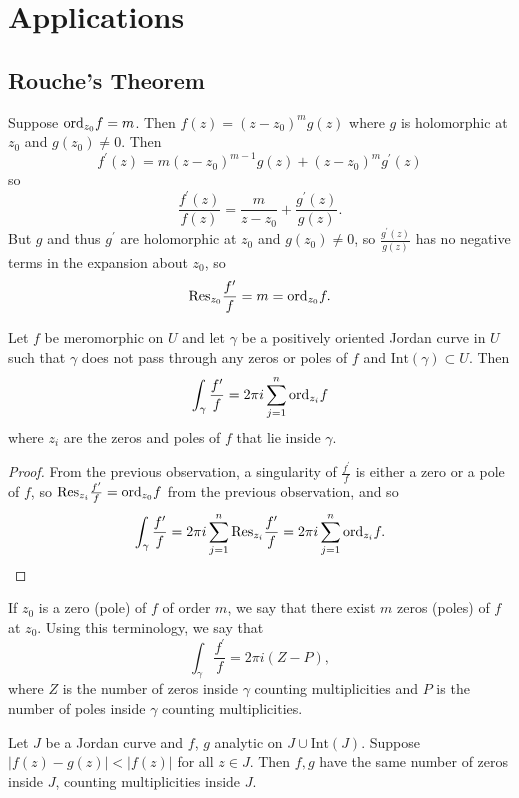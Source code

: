\section{Applications}

\subsection{Rouche's Theorem}

Suppose $\mathrm{ord}_{z_0} f = m$. Then $f(z) = (z - z_0)^m g(z)$
where $g$ is holomorphic at $z_0$ and $g(z_0) \neq 0$. Then
$$
  f^\prime(z)
= m (z - z_0)^{m-1} g(z)
+ (z - z_0)^m g^\prime(z)
$$
so
$$
  \frac{f^\prime(z)}{f(z)}
= \frac{m}{z - z_0}
+ \frac{g^\prime(z)}{g(z)}.
$$
But $g$ and thus $g^\prime$ are holomorphic at $z_0$ and
$g(z_0) \neq 0$, so $\frac{g^\prime(z)}{g(z)}$ has no
negative terms in the expansion about $z_0$, so
$$
  \mathrm{Res}_{z_0} \frac{f^\prime}{f}
= m
= \mathrm{ord}_{z_0} f.
$$

\begin{theorem}
Let $f$ be meromorphic on $U$ and let $\gamma$ be
a positively oriented Jordan curve in $U$ such that
$\gamma$ does not pass through any zeros or poles of $f$
and $\mathrm{Int}(\gamma) \subset U$. Then
$$
  \int_\gamma
    \frac{f^\prime}{f}
= 2 \pi i
  \sum_{j=1}^n
    \mathrm{ord}_{z_i} f
$$
where $z_i$ are the zeros and poles of $f$ that lie inside $\gamma$.
\end{theorem}
\begin{proof}
From the previous observation, a singularity of
$\frac{f^\prime}{f}$ is either a zero or a pole of $f$, so
$\mathrm{Res}_{z_i} \frac{f^\prime}{f} = \mathrm{ord}_{z_0} f$ from the
previous observation, and so
$$
  \int_\gamma \frac{f^\prime}{f}
= 2 \pi i
  \sum_{j=1}^n
    \mathrm{Res}_{z_i} \frac{f^\prime}{f}
= 2 \pi i
  \sum_{j=1}^n
    \mathrm{ord}_{z_i} f.
$$
\end{proof}

If $z_0$ is a zero (pole) of $f$ of order $m$, we say that
there exist $m$ zeros (poles) of $f$ at $z_0$. Using this terminology,
we say that
$$
\int_\gamma \frac{f^\prime}{f} = 2 \pi i (Z - P),
$$
where $Z$ is the number of zeros inside $\gamma$ counting
multiplicities and $P$ is the number of poles inside $\gamma$
counting multiplicities.

\begin{theorem}
Let $J$ be a Jordan curve and $f$, $g$ analytic on $J \cup
\mathrm{Int}(J)$. Suppose $|f(z) - g(z)| < |f(z)|$ for all
$z \in J$. Then $f, g$ have the same number of zeros inside
$J$, counting multiplicities inside $J$.
\end{theorem}

